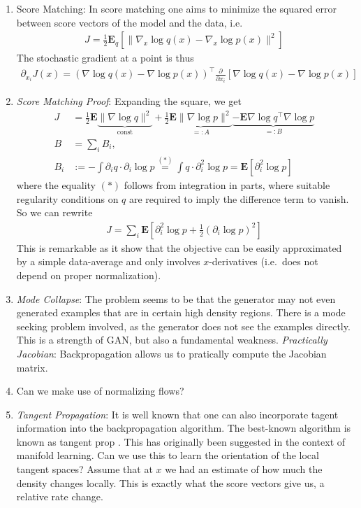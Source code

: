 \documentclass{article}
\newcommand{\E}{{\mathbf E}}
\begin{document}
\begin{enumerate}
%
\item{Score Matching}: In score matching \cite{hyvarinen2005estimation} one aims to minimize the squared error between score vectors of the model and the data, i.e.
\begin{align}
J = \frac 12 \E_q\left[ \| \nabla_x \log q(x) - \nabla_x \log p(x) \|^2 \right]
\end{align}
The stochastic gradient at a point is thus 
\begin{align}
\partial_{x_i} J(x) =  \left( \nabla \log q(x) - \nabla \log p(x) \right)^\top   \frac{\partial}{\partial x_i} \left[ \nabla \log q(x) - \nabla \log p(x)\right]
\end{align}
\item \textit{Score Matching Proof}: Expanding the square, we get 
\begin{align}
J & =  \frac12 \E \underbrace{\| \nabla \log q\|^2}_{\text{const}} + 
\frac 12 \underbrace{ \E \| \nabla \log p \|^2}_{=:A}  
\underbrace{-\E \nabla \log q^\top \nabla \log p }_{=:B} \\
B & =  \sum_i B_i, \quad \\
B_i & :=  -\int \partial_i q \cdot \partial_i \log p \stackrel {(*)}= \int q \cdot \partial_i^2 \log p 
= \E \left[ \partial_i^2 \log p \right]
\end{align}
where the equality $(*)$ follows from integration in parts, where suitable regularity conditions on $q$ are required to imply the difference term to vanish. So we can rewrite 
\begin{align}
J = \sum_i \E \left[ \partial_i^2 \log p + \frac 12 (\partial_i \log p)^2\right]
\end{align}
This is remarkable as it show that the objective can be easily approximated by a simple data-average and only involves $x$-derivatives (i.e.~does not depend on proper normalization).
\item \textit{Mode Collapse}: The problem seems to be that the generator may not even generated examples that are in certain high density regions. There is a mode seeking problem involved, as the generator does not see the examples directly. This is a strength of GAN, but also a fundamental weakness.
\textit{Practically Jacobian}: Backpropagation allows us to pratically compute the Jacobian matrix.
\item
Can we make use of normalizing flows? 
\item 
% 
\textit{Tangent Propagation}: 
%
It is well known that one can also incorporate tagent information into the backpropagation algorithm. The best-known algorithm is known as tangent prop \cite{simard...}. This has originally been suggested in the context of manifold learning. Can we use this to learn the orientation of the local tangent spaces? Assume that at $x$ we had an estimate of how much the density changes locally. This is exactly what the score vectors give us, a relative rate change. 

\end{enumerate}
\end{document}
